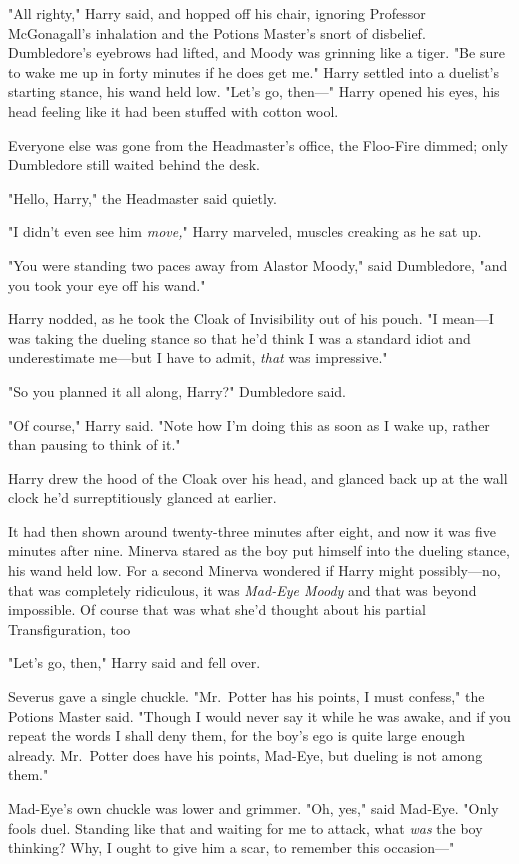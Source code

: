 "All righty," Harry said, and hopped off his chair, ignoring Professor
McGonagall's inhalation and the Potions Master's snort of disbelief.
Dumbledore's eyebrows had lifted, and Moody was grinning like a tiger. "Be sure
to wake me up in forty minutes if he does get me." Harry settled into a
duelist's starting stance, his wand held low. "Let's go, then—"
\sbreak
Harry opened his eyes, his head feeling like it had been stuffed with cotton
wool.

Everyone else was gone from the Headmaster's office, the Floo-Fire dimmed; only
Dumbledore still waited behind the desk.

"Hello, Harry," the Headmaster said quietly.

"I didn't even see him \emph{move,}" Harry marveled, muscles creaking as he
sat up.

"You were standing two paces away from Alastor Moody," said Dumbledore, "and
you took your eye off his wand."

Harry nodded, as he took the Cloak of Invisibility out of his pouch. "I
mean—I was taking the dueling stance so that he'd think I was a standard
idiot and underestimate me—but I have to admit, \emph{that} was impressive."

"So you planned it all along, Harry?" Dumbledore said.

"Of course," Harry said. "Note how I'm doing this as soon as I wake up, rather
than pausing to think of it."

Harry drew the hood of the Cloak over his head, and glanced back up at the wall
clock he'd surreptitiously glanced at earlier.

It had then shown around twenty-three minutes after eight, and now it was five
minutes after nine.
\sbreak
Minerva stared as the boy put himself into the dueling stance, his wand held
low. For a second Minerva wondered if Harry might possibly—no, that was
completely ridiculous, it was \emph{Mad-Eye Moody} and that was beyond
impossible. Of course that was what she'd thought about his partial
Transfiguration, too{\el}

"Let's go, then," Harry said and fell over.

Severus gave a single chuckle. "Mr.~Potter has his points, I must confess," the
Potions Master said. "Though I would never say it while he was awake, and if
you repeat the words I shall deny them, for the boy's ego is quite large enough
already. Mr.~Potter does have his points, Mad-Eye, but dueling is not among
them."

Mad-Eye's own chuckle was lower and grimmer. "Oh, yes," said Mad-Eye. "Only
fools duel. Standing like that and waiting for me to attack, what \emph{was}
the boy thinking? Why, I ought to give him a scar, to remember this occasion—"

